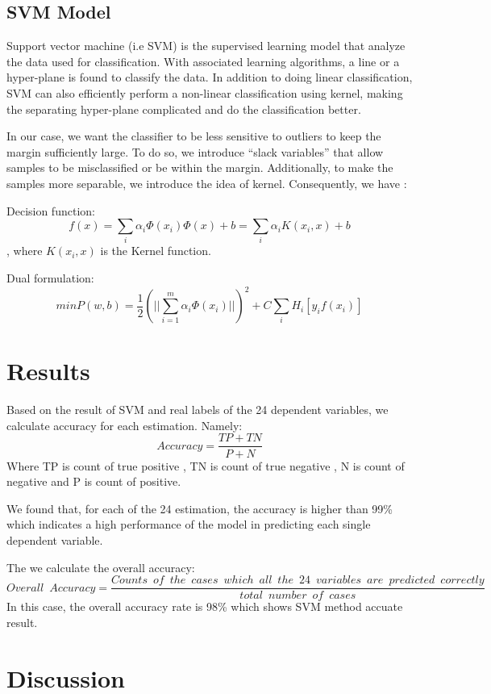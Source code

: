 \documentclass{article}
\begin{document}
\subsection{SVM Model}

Support vector machine (i.e SVM) is the supervised learning model that analyze the data used for classification. With associated learning algorithms, a line or a hyper-plane is found to classify the data. In addition to doing linear classification, SVM can also efficiently perform a non-linear classification using kernel, making the separating hyper-plane complicated and do the classification better.

In our case, we want the classifier to be less sensitive to outliers to keep the margin sufficiently large. To do so, we introduce “slack variables” that allow samples to be misclassified or be within the margin. Additionally, to make the samples more separable, we introduce the idea of kernel. Consequently, we have :

Decision function:
$$f(x) = \displaystyle\sum_{i}\alpha_i\Phi(x_i)\Phi(x)+b = \displaystyle\sum_{i}\alpha_{i} K(x_i, x)+b$$, where $K(x_i, x)$ is the Kernel function.

Dual formulation:
$$min P(w,b) = \frac{1}{2}(||\displaystyle\sum_{i=1}^{m}\alpha_i\Phi(x_i)||)^2 + C\displaystyle\sum_{i}H_{i}[y_{i}f(x_i)]$$

\section{Results}

Based on the result of SVM and real labels of the 24 dependent variables, we calculate accuracy for each estimation. Namely:
$$Accuracy = \frac{TP+TN}{P+N}$$
Where TP is count of true positive , TN is count of true negative , N is count of negative and P is count of positive.

We found that, for each of the 24 estimation, the accuracy is higher than 99\% which indicates a high performance of the model in predicting each single dependent variable.

The we calculate the overall accuracy:
$$Overall\enspace Accuracy = \frac{Counts\enspace of\enspace the\enspace cases\enspace which\enspace all\enspace the\enspace 24\enspace variables\enspace are\enspace predicted\enspace correctly}{total\enspace number\enspace of\enspace cases}$$
In this case, the overall accuracy rate is 98\% which shows SVM method accuate result.

\section{Discussion}
\end{document}
